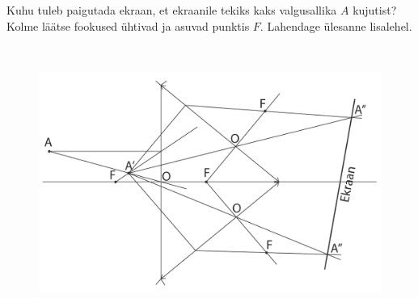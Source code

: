 
Kuhu tuleb paigutada ekraan, et ekraanile tekiks kaks valgusallika $A$ kujutist? Kolme läätse fookused ühtivad ja asuvad punktis $F$. Lahendage ülesanne lisalehel.



\hint

\solu
\

\begin{figure}[h]
    \centering
    \includegraphics[scale=0.5]{2022-v3g-04-yl.pdf}
\end{figure}
\probend
